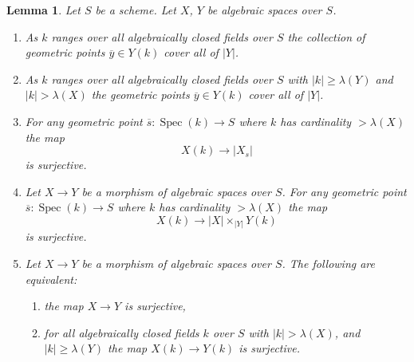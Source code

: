 \documentclass{stacks-project}
\theoremstyle{plain}
\newtheorem{lemma}[subsection]{Lemma}
\theoremstyle{definition}
\theoremstyle{remark}
\numberwithin{equation}{subsection}
\def\Spec{\mathop{\mathrm{Spec}}}
\begin{document}
\begin{lemma}
\label{lemma-large-enough}
Let $S$ be a scheme. Let $X$, $Y$ be algebraic spaces over $S$.
\begin{enumerate}
\item As $k$ ranges over all algebraically closed fields over $S$
the collection of geometric points $\overline{y} \in Y(k)$ cover all of $|Y|$.
\item As $k$ ranges over all algebraically closed fields over $S$ with
$|k| \geq \lambda(Y)$ and $|k| > \lambda(X)$ the geometric points
$\overline{y} \in Y(k)$ cover all of $|Y|$.
\item For any geometric point
$\overline{s} : \Spec(k) \to S$ where
$k$ has cardinality $> \lambda(X)$ the map
$$
X(k) \longrightarrow |X_s|
$$
is surjective.
\item Let $X \to Y$ be a morphism of algebraic spaces over $S$.
For any geometric point $\overline{s} : \Spec(k) \to S$ where
$k$ has cardinality $> \lambda(X)$ the map
$$
X(k) \longrightarrow |X| \times_{|Y|} Y(k)
$$
is surjective.
\item Let $X \to Y$ be a morphism of algebraic spaces over $S$.
The following are equivalent:
\begin{enumerate}
\item the map $X \to Y$ is surjective,
\item for all algebraically closed fields $k$ over $S$ with
$|k| > \lambda(X)$, and $|k| \geq \lambda(Y)$ the map $X(k) \to Y(k)$
is surjective.
\end{enumerate}
\end{enumerate}
\end{lemma}
\end{document}
